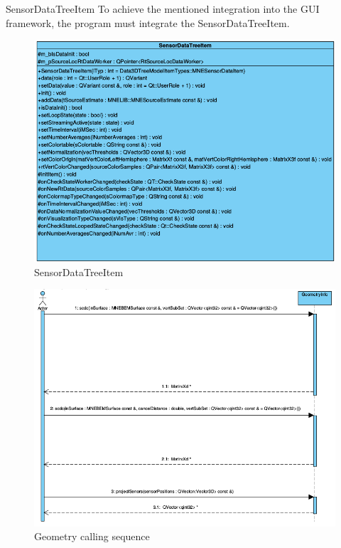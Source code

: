 \begin{aims}
\item[SensorDataTreeItem] To achieve the mentioned integration into the GUI framework, the program must integrate the SensorDataTreeItem.

\begin{figure}[h]
	\begin{center}
		\includegraphics[width=16cm]{figures/sensordatatreeitemclassdiagram.png}
		\caption{SensorDataTreeItem}
	\end{center}
\end{figure}

\end{aims}

\begin{figure}[h]
	\begin{center}
		\includegraphics[width=16cm]{figures/geometryinfo_calling_sequence.png}
		\caption{Geometry calling sequence}
	\end{center}
\end{figure}

